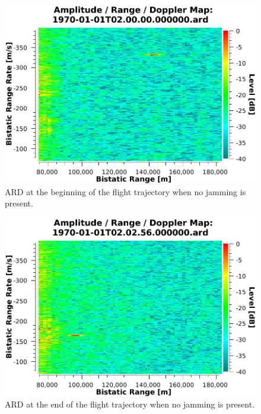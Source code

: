 \documentclass[conference]{IEEEtran}
\begin{document}
\begin{figure}[htbp]
\begin{center}
\includegraphics[width=1.0\columnwidth]{figs/Simulations/NoJammingARDFirst.pdf}
\caption{ARD at the beginning of the flight trajectory when no jamming is present.}
\label{fig:NoJammingARDFirst}
\end{center}
\end{figure}

\begin{figure}[htbp]
\begin{center}
\includegraphics[width=01.0\columnwidth]{figs/Simulations/NoJammingARDLast.pdf}
\caption{ARD at the end of the flight trajectory when no jamming is present.}
\label{fig:NoJammingARDLast}
\end{center}
\end{figure}
\end{document}
